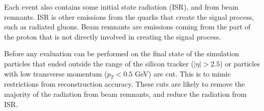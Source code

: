     Each event also contains some initial state radiation (ISR),
    and from beam remnants.
    ISR is other emissions from the quarks that create the signal process,
    such as radiated gluons.
    Beam remnants are emissions coming from the part of the proton that is not directly involved
    in creating the signal process.



    Before any evaluation can be performed on the final state of the simulation
    particles that ended outside the range of the silicon tracker (\(|\eta|>2.5\))
    or particles with low transverse momentum (\(p_T < 0.5\) GeV) are cut.
    This is to mimic restrictions from reconstruction accuracy.
    These cuts are likely to remove the majority of the radiation from beam remnants,
    and reduce the radiation from ISR.

